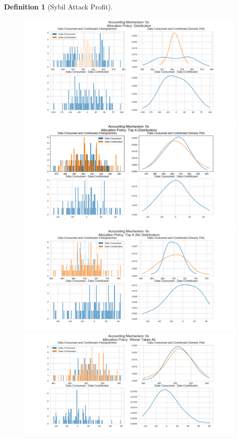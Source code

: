 \documentclass[11pt,a4paper]{report}
\theoremstyle{definition}
\newtheorem{definition}{Definition}[section]
\theoremstyle{theorem}
\theoremstyle{proposition}
\theoremstyle{corollary}
\theoremstyle{lemma}
\theoremstyle{example}
\theoremstyle{remark}
\begin{document}
\begin{definition}[Sybil Attack Profit]
\begin{figure}[H]
\begin{center}
\includegraphics[scale=0.4]{Acc_0s_Dist.png}
\includegraphics[scale=0.4]{Acc_0s_Top_4_Dist.png}
\includegraphics[scale=0.4]{Acc_0s_Top_4_No_Dist.png}
\includegraphics[scale=0.4]{Acc_0s_Winner.png}
\end{center}
\end{figure}


\end{definition}
\end{document}
